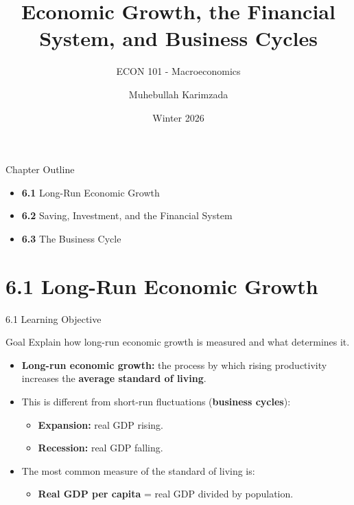 \documentclass[aspectratio=169]{beamer}
\title{\textbf{Economic Growth, the Financial System, and Business Cycles  \vspace{.5cm}\\  }}
\subtitle{ {\large ECON 101 - Macroeconomics}}
\author{Muhebullah Karimzada}
\date{Winter 2026}
\begin{document}
\begin{frame}[plain]
  \titlepage
\end{frame}

\begin{frame}{Chapter Outline}
\transfade
\begin{itemize}[<+->]
  \item \textbf{6.1} Long-Run Economic Growth
  \item \textbf{6.2} Saving, Investment, and the Financial System
  \item \textbf{6.3} The Business Cycle
\end{itemize}
\end{frame}

\section{6.1 Long-Run Economic Growth}

\begin{frame}{6.1 Learning Objective}
\transfade
\begin{block}{Goal}
Explain how long-run economic growth is measured and what determines it.
\end{block}
\begin{itemize}[<+->]
  \item \textbf{Long-run economic growth:} the process by which rising \alert{productivity} increases the \textbf{average standard of living}.
  \item This is different from short-run fluctuations (\textbf{business cycles}):
  \begin{itemize}[<+->]
    \item \textbf{Expansion:} real GDP rising.
    \item \textbf{Recession:} real GDP falling.
  \end{itemize}
  \item The most common measure of the standard of living is:
  \begin{itemize}[<+->]
    \item \textbf{Real GDP per capita} = real GDP divided by population.
  \end{itemize}
\end{itemize}
\end{frame}
\end{document}
